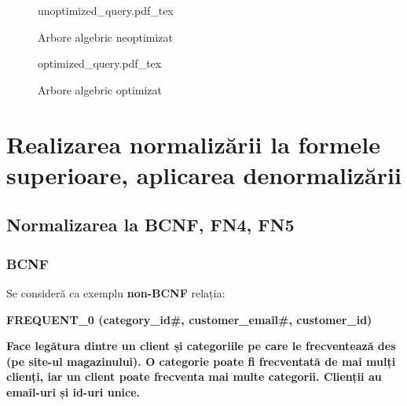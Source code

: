 \documentclass[a4paper, oneside, 12pt]{article}
\newcommand{\incfig}[1]{%
    \def\svgwidth{\columnwidth}
    {#1.pdf_tex}
}
\begin{document}
\begin{center}

\minipage{\linewidth}

\endminipage

\end{center}

\begin{center}

\minipage{\linewidth}

\endminipage

\end{center}

\begin{figure}[H]
    \centering
    \incfig{unoptimized_query}
    \caption{Arbore algebric neoptimizat}
\end{figure}

\begin{figure}[H]
    \centering
    \incfig{optimized_query}
    \caption{Arbore algebric optimizat}
\end{figure}

\section{Realizarea normalizării la formele superioare, aplicarea denormalizării}

\subsection{Normalizarea la \textbf{BCNF}, \textbf{FN4}, \textbf{FN5}}

\subsubsection{\textbf{BCNF}}

Se consideră ca exemplu \textbf{non-BCNF} relația:

\begin{m_itemize}
        \item \textbf{FREQUENT\_0 (category\_id\#, customer\_email\#, customer\_id)}
        \item \textbf{Face legătura dintre un client și categoriile pe care le
              frecventează des (pe site-ul magazinului).  O categorie poate
              fi frecventată de mai mulți clienți, iar un client poate frecventa mai
              multe categorii. Clienții au email-uri și id-uri unice.}
\end{m_itemize}
\end{document}
